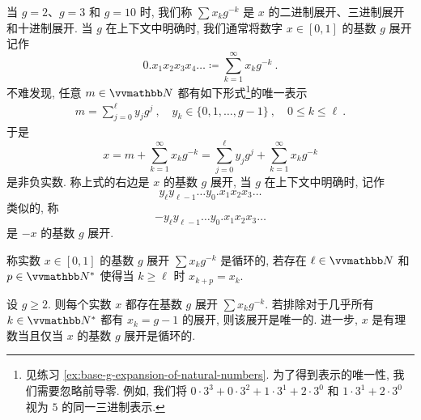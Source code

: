 当 \(g = 2\)、\(g = 3\) 和 \(g = 10\) 时, 我们称 \(\sum x_k g^{- k}\) 是 \(x\) 的二进制展开、三进制展开和十进制展开. 当 \(g\) 在上下文中明确时, 我们通常将数字 \(x \in [0, 1]\) 的基数 \(g\) 展开记作
\[
    0.x_1 x_2 x_3 x_4 \ldots \coloneqq \sum_{k = 1}^\infty x_k g^{- k}\ .
\]
不难发现, 任意 \(m \in \N\) 都有如下形式\footnote{见练习 \ref{ex:base-g-expansion-of-natural-numbers}. 为了得到表示的唯一性, 我们需要忽略前导零. 例如, 我们将 \(0 \cdot 3^3 + 0 \cdot 3^2 + 1 \cdot 3^1 + 2 \cdot 3^0\) 和 \(1 \cdot 3^1 + 2 \cdot 3^0\) 视为 \(5\) 的同一三进制表示.}的唯一表示
\begin{align}\label{exp:base-g-expansion-of-natural-numbers-2}
    m = \sum_{j = 0}^\ell y_j g^j\ ,\quad y_k \in \{0, 1, \ldots, g - 1\}\ ,\quad 0 \leq k \leq \ell\ .
\end{align}
于是
\[
    x = m + \sum_{k = 1}^\infty x_k g^{- k} = \sum_{j = 0}^\ell y_j g^j + \sum_{k = 1}^\infty x_k g^{- k}
\]
是非负实数. 称上式的右边是 \(x\) 的基数 \(g\) 展开, 当 \(g\) 在上下文中明确时, 记作
\[
    y_\ell y_{\ell - 1} \ldots y_0. x_1 x_2 x_3 \ldots
\]
类似的, 称
\[
    - y_\ell y_{\ell - 1} \ldots y_0. x_1 x_2 x_3 \ldots
\]
是 \(- x\) 的基数 \(g\) 展开.

\begin{definition}[循环节]
    称实数 \(x \in [0, 1]\) 的基数 \(g\) 展开 \(\sum x_k g^{- k}\) 是循环的, 若存在 \(\ell \in \N\) 和 \(p \in \N^\ast\) 使得当 \(k \geq \ell\) 时 \(x_{k + p} = x_k\).
\end{definition}

\begin{theorem}\label{thm:base-g-expansion-of-real-numbers}
    设 \(g \geq 2\). 则每个实数 \(x\) 都存在基数 \(g\) 展开 \(\sum x_k g^{- k}\). 若排除对于几乎所有 \(k \in \N^\ast\) 都有 \(x_k = g - 1\) 的展开, 则该展开是唯一的. 进一步, \(x\) 是有理数当且仅当 \(x\) 的基数 \(g\) 展开是循环的.
\end{theorem}

